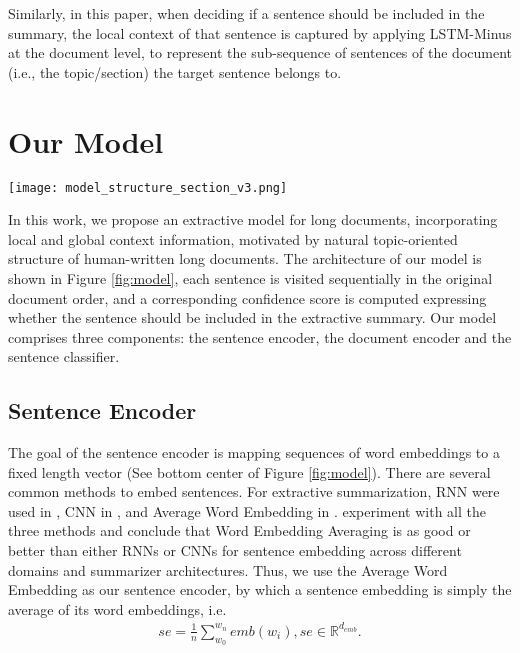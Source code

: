Similarly, in this paper, when deciding if a sentence should be included in the summary, the local context of that sentence is captured by applying LSTM-Minus at the document level, to represent the sub-sequence of sentences of the document (i.e., the topic/section) the target sentence belongs to.

\section{Our Model}
\begin{figure*}[t!]
    \centering
    \texttt{[image: model\_structure\_section\_v3.png]}
    \caption{The structure of our model, $se_i,sr_i$ represent the sentence embedding and sentence representation of sentence $i$, respectively. The binary decision of whether the sentence should be included in the summary is based on the sentence itself (A), the whole document (B) and the current topic (C). The document representation is simply the concatenation of the last hidden states of the forward and backward RNNs, while the topic segment representation is computed by applying LSTM-Minus, as shown in detail in the left panel (Detail of C).}
    \label{fig:model}
\end{figure*}
In this work, we propose an extractive model for long documents, incorporating local and global context information, motivated by natural topic-oriented structure of human-written long documents. The architecture of our model is shown in Figure \ref{fig:model}, each sentence is visited sequentially in the original document order, and a corresponding confidence score is computed expressing whether the sentence should be included in the extractive summary.
Our model comprises three components: the sentence encoder, the document encoder and the sentence classifier.
\subsection{Sentence Encoder}
The goal of the sentence encoder is mapping sequences of word embeddings to a fixed length vector (See bottom center of Figure \ref{fig:model}). There are several common %
methods to embed sentences. For  extractive summarization, RNN were used in \cite{summarunner}, CNN in \cite{cheng&lapata}, and Average Word Embedding in \cite{EMNLP2018}.  experiment with all the three methods and conclude that Word Embedding Averaging is as good or better than either RNNs or CNNs for sentence embedding across different domains and summarizer architectures. Thus, we use the Average Word Embedding as our sentence encoder, by which a sentence embedding is simply the average of its word embeddings, i.e. 
\begin{eqnarray*}
se=\frac{1}{n}\sum_{w_0}^{w_n}emb(w_i), se\in \mathbb{R}^{d_{emb}}.
\end{eqnarray*}

